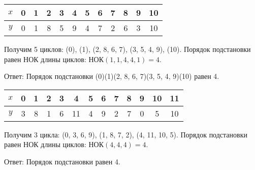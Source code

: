 \medskip

\begin{tabular}{||c||c|c|c|c|c|c|c|c|c|c|c|}
 $x$ & 0 & 1 & 2 & 3 & 4 & 5 & 6 & 7 & 8 & 9 & 10 \\
 \hline
 $y$ & 0 & 1 & 8 & 5 & 9 & 4 & 7 & 2 & 6 & 3 & 10
\end{tabular}

\medskip

Получим 5 циклов: (0), (1), (2, 8, 6, 7), (3, 5, 4, 9), (10). Порядок подстановки равен НОК длины циклов: НОК$(1, 1, 4, 4, 1) = 4$.

Ответ: Порядок подстановки (0)(1)(2, 8, 6, 7)(3, 5, 4, 9)(10) равен 4.


\medskip

\begin{tabular}{||c||c|c|c|c|c|c|c|c|c|c|c|c|}
 $x$ & 0 & 1 & 2 & 3 & 4 & 5 & 6 & 7 & 8 & 9 & 10 & 11 \\
 \hline
 $y$ & 3 & 8 & 1 & 6 & 11 & 4 & 9 & 2 & 7 & 0 & 5 & 10
\end{tabular}

\medskip

Получим 3 цикла: (0, 3, 6, 9), (1, 8, 7, 2), (4, 11, 10, 5). Порядок подстановки равен НОК длины циклов: НОК$(4, 4, 4) = 4$.

Ответ: Порядок подстановки равен 4.